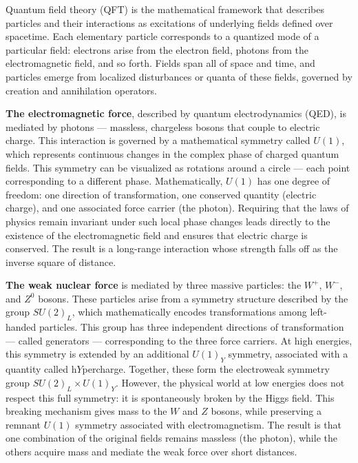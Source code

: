 Quantum field theory (QFT) is the mathematical framework that describes particles and their interactions as excitations of underlying fields defined over spacetime. Each elementary particle corresponds to a quantized mode of a particular field: electrons arise from the electron field, photons from the electromagnetic field, and so forth. Fields span all of space and time, and particles emerge from localized disturbances or quanta of these fields, governed by creation and annihilation operators.

\textbf{The electromagnetic force}, described by quantum electrodynamics (QED), is mediated by photons — massless, chargeless bosons that couple to electric charge. This interaction is governed by a mathematical symmetry called \(U(1)\), which represents continuous changes in the complex phase of charged quantum fields. This symmetry can be visualized as rotations around a circle — each point corresponding to a different phase. Mathematically, \(U(1)\) has one degree of freedom: one direction of transformation, one conserved quantity (electric charge), and one associated force carrier (the photon). Requiring that the laws of physics remain invariant under such local phase changes leads directly to the existence of the electromagnetic field and ensures that electric charge is conserved. The result is a long-range interaction whose strength falls off as the inverse square of distance.

\textbf{The weak nuclear force} is mediated by three massive particles: the \(W^+\), \(W^-\), and \(Z^0\) bosons. These particles arise from a symmetry structure described by the group \(SU(2)_L\), which mathematically encodes transformations among left-handed particles. This group has three independent directions of transformation — called generators — corresponding to the three force carriers. At high energies, this symmetry is extended by an additional \(U(1)_Y\) symmetry, associated with a quantity called h$Y$percharge. Together, these form the electroweak symmetry group \(SU(2)_L \times U(1)_Y\). However, the physical world at low energies does not respect this full symmetry: it is spontaneously broken by the Higgs field. This breaking mechanism gives mass to the \(W\) and \(Z\) bosons, while preserving a remnant \(U(1)\) symmetry associated with electromagnetism. The result is that one combination of the original fields remains massless (the photon), while the others acquire mass and mediate the weak force over short distances.

